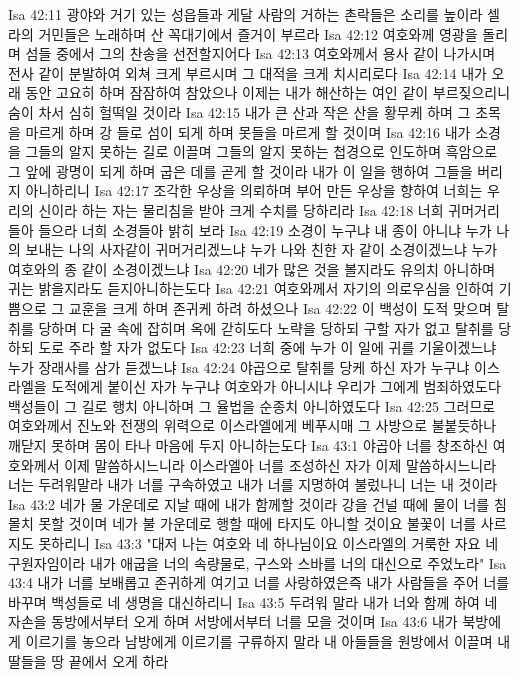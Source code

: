 Isa 42:11  광야와 거기 있는 성읍들과 게달 사람의 거하는 촌락들은 소리를 높이라 셀라의 거민들은 노래하며 산 꼭대기에서 즐거이 부르라
Isa 42:12  여호와께 영광을 돌리며 섬들 중에서 그의 찬송을 선전할지어다
Isa 42:13  여호와께서 용사 같이 나가시며 전사 같이 분발하여 외쳐 크게 부르시며 그 대적을 크게 치시리로다
Isa 42:14  내가 오래 동안 고요히 하며 잠잠하여 참았으나 이제는 내가 해산하는 여인 같이 부르짖으리니 숨이 차서 심히 헐떡일 것이라
Isa 42:15  내가 큰 산과 작은 산을 황무케 하며 그 초목을 마르게 하며 강 들로 섬이 되게 하며 못들을 마르게 할 것이며
Isa 42:16  내가 소경을 그들의 알지 못하는 길로 이끌며 그들의 알지 못하는 첩경으로 인도하며 흑암으로 그 앞에 광명이 되게 하며 굽은 데를 곧게 할 것이라 내가 이 일을 행하여 그들을 버리지 아니하리니
Isa 42:17  조각한 우상을 의뢰하며 부어 만든 우상을 향하여 너희는 우리의 신이라 하는 자는 물리침을 받아 크게 수치를 당하리라
Isa 42:18  너희 귀머거리들아 들으라 너희 소경들아 밝히 보라
Isa 42:19  소경이 누구냐 내 종이 아니냐 누가 나의 보내는 나의 사자같이 귀머거리겠느냐 누가 나와 친한 자 같이 소경이겠느냐 누가 여호와의 종 같이 소경이겠느냐
Isa 42:20  네가 많은 것을 볼지라도 유의치 아니하며 귀는 밝을지라도 듣지아니하는도다
Isa 42:21  여호와께서 자기의 의로우심을 인하여 기쁨으로 그 교훈을 크게 하며 존귀케 하려 하셨으나
Isa 42:22  이 백성이 도적 맞으며 탈취를 당하며 다 굴 속에 잡히며 옥에 갇히도다 노략을 당하되 구할 자가 없고 탈취를 당하되 도로 주라 할 자가 없도다
Isa 42:23  너희 중에 누가 이 일에 귀를 기울이겠느냐 누가 장래사를 삼가 듣겠느냐
Isa 42:24  야곱으로 탈취를 당케 하신 자가 누구냐 이스라엘을 도적에게 붙이신 자가 누구냐 여호와가 아니시냐 우리가 그에게 범죄하였도다 백성들이 그 길로 행치 아니하며 그 율법을 순종치 아니하였도다
Isa 42:25  그러므로 여호와께서 진노와 전쟁의 위력으로 이스라엘에게 베푸시매 그 사방으로 불붙듯하나 깨닫지 못하며 몸이 타나 마음에 두지 아니하는도다
Isa 43:1  야곱아 너를 창조하신 여호와께서 이제 말씀하시느니라 이스라엘아 너를 조성하신 자가 이제 말씀하시느니라 너는 두려워말라 내가 너를 구속하였고 내가 너를 지명하여 불렀나니 너는 내 것이라
Isa 43:2  네가 물 가운데로 지날 때에 내가 함께할 것이라 강을 건널 때에 물이 너를 침몰치 못할 것이며 네가 불 가운데로 행할 때에 타지도 아니할 것이요 불꽃이 너를 사르지도 못하리니
Isa 43:3  "대저 나는 여호와 네 하나님이요 이스라엘의 거룩한 자요 네 구원자임이라 내가 애굽을 너의 속량물로, 구스와 스바를 너의 대신으로 주었노라"
Isa 43:4  내가 너를 보배롭고 존귀하게 여기고 너를 사랑하였은즉 내가 사람들을 주어 너를 바꾸며 백성들로 네 생명을 대신하리니
Isa 43:5  두려워 말라 내가 너와 함께 하여 네 자손을 동방에서부터 오게 하며 서방에서부터 너를 모을 것이며
Isa 43:6  내가 북방에게 이르기를 놓으라 남방에게 이르기를 구류하지 말라 내 아들들을 원방에서 이끌며 내 딸들을 땅 끝에서 오게 하라
